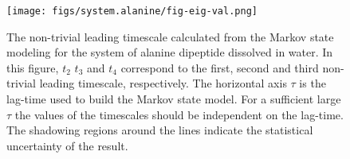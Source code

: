 \documentclass[epjST]{svjour}
\newcommand{\vect}[1]{\textbf{\textit{#1}}}
\begin{document}



\begin{figure}
  \centering
  \texttt{[image: figs/system.alanine/fig-eig-val.png]}
  \caption{The non-trivial leading timescale calculated from the
    Markov state modeling for the system of alanine dipeptide
    dissolved in water. In this figure, $t_2$ $t_3$ and $t_4$
    correspond to the first, second and third non-trivial leading
    timescale, respectively. The horizontal axis $\tau$ is the
    lag-time used to build the Markov state model. For a sufficient
    large $\tau$ the values of the timescales should be independent on
    the lag-time. The shadowing regions around the lines indicate the
    statistical uncertainty of the result. }
  \label{fig:ala-msm-t}
\end{figure}
\end{document}
